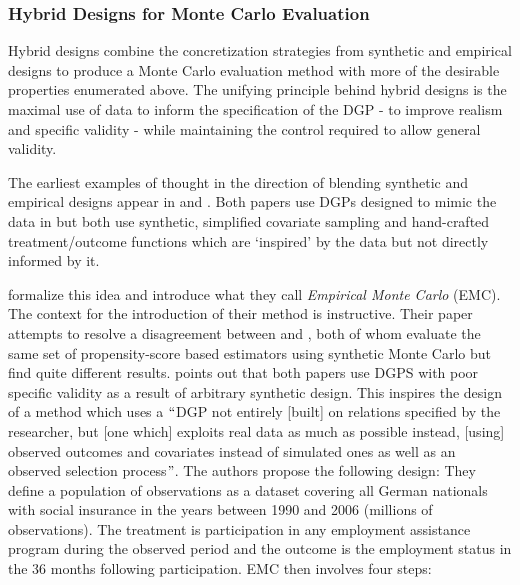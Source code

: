 \documentclass[../main.tex]{subfiles}
\begin{document}
\subsubsection{Hybrid Designs for Monte Carlo Evaluation}

Hybrid designs combine the concretization strategies from synthetic and empirical designs to produce a Monte Carlo evaluation method with more of the desirable properties enumerated above. The unifying principle behind hybrid designs is the maximal use of data to inform the specification of the DGP - to improve realism and specific validity - while maintaining the control required to allow general validity.\par


\vspace{\baselineskip}
The earliest examples of thought in the direction of blending synthetic and empirical designs appear in \textcite{Abadie2002LargeEffects} and \textcite{Diamond2012GeneticStudies}. Both papers use DGPs designed to mimic the data in \textcite{Lalonde1986EvaluatingData} but both use synthetic, simplified covariate sampling and hand-crafted treatment/outcome functions which are ‘inspired’ by the data but not directly informed by it.\par


\vspace{\baselineskip}
\textcite{Huber2013TheScore} formalize this idea and introduce what they call \textit{Empirical Monte Carlo }(EMC). The context for the introduction of their method is instructive. Their paper attempts to resolve a disagreement between \textcite{Frolich2004Finite-sampleEstimators} and \textcite{Busso2014NewEstimators}, both of whom evaluate the same set of propensity-score based estimators using synthetic Monte Carlo but find quite different results. \textcite{Huber2013TheScore} points out that both papers use DGPS with poor specific validity as a result of arbitrary synthetic design. This inspires the design of a method which uses a $``$DGP not entirely [built] on relations specified by the researcher, but [one which] exploits real data as much as possible instead, [using] observed outcomes and covariates instead of simulated ones as well as an observed selection process$"$. The authors propose the following design: They define a population of observations as a dataset covering all German nationals with social insurance in the years between 1990 and 2006 (millions of observations). The treatment is participation in any employment assistance program during the observed period and the outcome is the employment status in the 36 months following participation. EMC then involves four steps: \par
\end{document}
